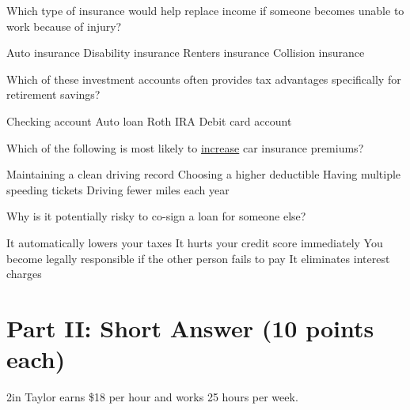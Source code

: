 \documentclass[12pt]{exam}
\begin{document}
\begin{questions}
	\begin{mcquestion}[2]
		Which type of insurance would help replace income if someone becomes unable to work because of injury?
		\begin{choices}
			\choice Auto insurance
			\CorrectChoice Disability insurance
			\choice Renters insurance
			\choice Collision insurance
		\end{choices}
	\end{mcquestion}
	
	\begin{mcquestion}[2]
		Which of these investment accounts often provides tax advantages 
		specifically for retirement savings?
		\begin{choices}
			\choice Checking account
			\choice Auto loan
			\CorrectChoice Roth IRA
			\choice Debit card account
		\end{choices}
	\end{mcquestion}
	
	\begin{mcquestion}[2]
		Which of the following is most likely to \underline{increase} car insurance premiums?
		\begin{choices}
			\choice Maintaining a clean driving record
			\choice Choosing a higher deductible
			\CorrectChoice Having multiple speeding tickets
			\choice Driving fewer miles each year
		\end{choices}
	\end{mcquestion}
	
	\begin{mcquestion}[2]
		Why is it potentially risky to co-sign a loan for someone else?
		\begin{choices}
			\choice It automatically lowers your taxes
			\choice It hurts your credit score immediately
			\CorrectChoice You become legally responsible if the other person fails to pay
			\choice It eliminates interest charges
		\end{choices}
	\end{mcquestion}
	
	\section*{Part II: Short Answer (10 points each)}
	
	\begin{shortanswer}[10]{2in}
		Taylor earns \$18 per hour and works 25 hours per week.
		

\end{shortanswer}
\end{questions}
\end{document}

